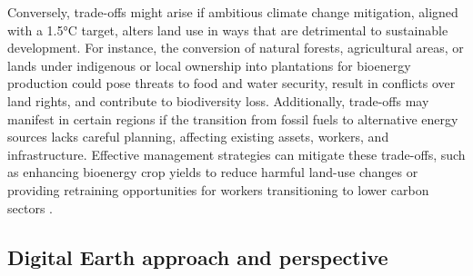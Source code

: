 Conversely, trade-offs might arise if ambitious climate change mitigation, aligned with a 1.5°C target, alters land use in ways that are detrimental to sustainable development. For instance, the conversion of natural forests, agricultural areas, or lands under indigenous or local ownership into plantations for bioenergy production could pose threats to food and water security, result in conflicts over land rights, and contribute to biodiversity loss. Additionally, trade-offs may manifest in certain regions if the transition from fossil fuels to alternative energy sources lacks careful planning, affecting existing assets, workers, and infrastructure. Effective management strategies can mitigate these trade-offs, such as enhancing bioenergy crop yields to reduce harmful land-use changes or providing retraining opportunities for workers transitioning to lower carbon sectors \citep{ipcccfaq}. \par

\subsection{Digital Earth approach and perspective}

